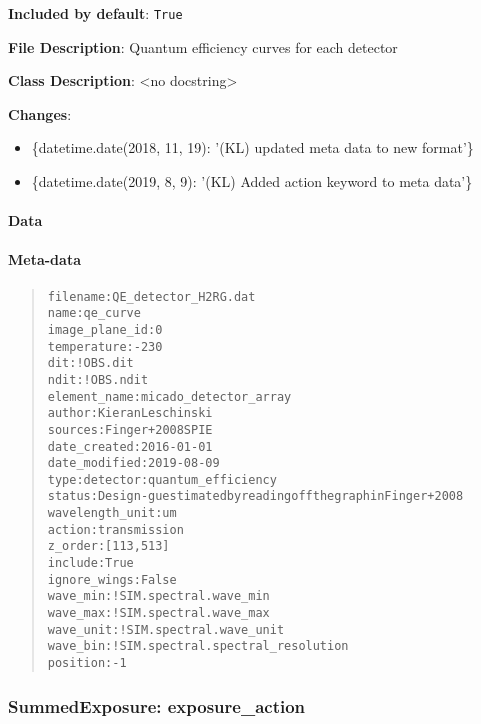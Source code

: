\textbf{Included by default}: \texttt{True}

\textbf{File Description}: Quantum efficiency curves for each detector

\textbf{Class Description}: <no docstring>

\textbf{Changes}:

\begin{itemize}
\item \{datetime.date(2018, 11, 19): '(KL) updated meta data to new format'\}

\item \{datetime.date(2019, 8, 9): '(KL) Added action keyword to meta data'\}
\end{itemize}


\paragraph{Data%
  \label{id3}%
}


\paragraph{Meta-data%
  \label{id4}%
}

\begin{quote}
\begin{alltt}
       filename : QE_detector_H2RG.dat
           name : qe_curve
 image_plane_id : 0
    temperature : -230
            dit : !OBS.dit
           ndit : !OBS.ndit
   element_name : micado_detector_array
         author : Kieran Leschinski
        sources : Finger+ 2008 SPIE
   date_created : 2016-01-01
  date_modified : 2019-08-09
           type : detector:quantum_efficiency
         status : Design - guestimated by reading off the graph in Finger+ 2008
wavelength_unit : um
         action : transmission
        z_order : [113, 513]
        include : True
   ignore_wings : False
       wave_min : !SIM.spectral.wave_min
       wave_max : !SIM.spectral.wave_max
      wave_unit : !SIM.spectral.wave_unit
       wave_bin : !SIM.spectral.spectral_resolution
       position : -1
\end{alltt}
\end{quote}


\subsubsection{SummedExposure: \textquotedbl{}exposure\_action\textquotedbl{}%
  \label{summedexposure-exposure-action}%
}

